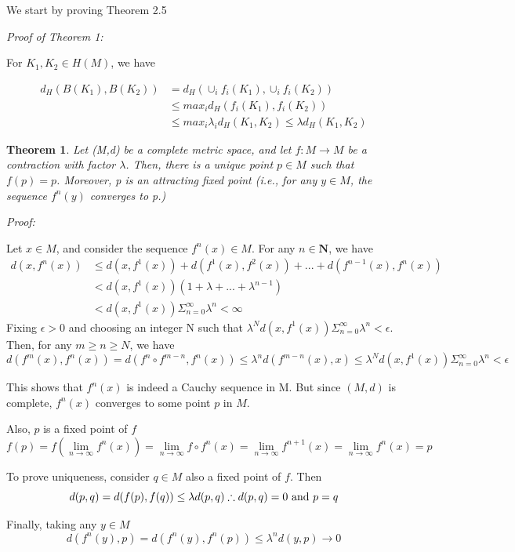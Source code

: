 \documentclass[a4paper]{article}
\theoremstyle{plain}
\newtheorem{theorem}{Theorem}[section] %
\theoremstyle{definition}
\begin{document}
We start by proving Theorem 2.5

\textit{Proof of Theorem 1: }

For $K_1, K_2 \in H(M)$, we have

\begin{align*}
    d_H(B(K_1), B(K_2)) &= d_H(\cup_i f_i(K_1),\cup_i f_i(K_2))\\
    &\leq max_i d_H(f_i(K_1),f_i(K_2))\\
    &\leq max_i \lambda _i d_H(K_1,K_2) \leq \lambda d_H(K_1,K_2)
\end{align*}
\qedsymbol

\begin{theorem}
Let (M,d) be a complete metric space, and let $f: M\rightarrow M$ be a contraction with factor $\lambda$. Then, there is a unique point $p \in M$ such that $f(p) = p$. Moreover, p is an attracting fixed point (i.e., for any $y \in M$, the sequence $f^n(y)$ converges to p.)
\end{theorem}

\textit{Proof: }

Let $x \in M$, and consider the sequence $f^n(x) \in M$. For any $n \in \mathbf{N}$, we have
\begin{align*}
    d(x, f^n(x)) &\leq d(x, f^1(x)) + d(f^1(x), f^2(x)) + ... + d(f^{n-1}(x),f^n(x))\\
    &<d(x,f^1(x))(1 + \lambda + ... + \lambda^{n-1}) \\
    &< d(x, f^1(x))\Sigma^\infty_{n=0}\lambda^n < \infty
\end{align*}
Fixing $\epsilon > 0$ and choosing an integer N such that $\lambda^N d(x, f^1(x))\Sigma^{\infty}_{n=0}\lambda^n < \epsilon$. Then, for any $m \geq n \geq N$, we have
$$d(f^m(x),f^n(x)) = d(f^n\circ f^{m-n},f^n(x)) \leq \lambda^n d(f^{m-n}(x),x) \leq \lambda^N d(x,f^1(x))\Sigma^\infty_{n=0}\lambda^n < \epsilon$$

This shows that $f^n(x)$ is indeed a Cauchy sequence in M. But since $(M,d)$ is complete, $f^n(x)$ converges to some point $p$ in $M$.

Also, $p$ is a fixed point of $f$
$$f(p) = f(\lim_{n\rightarrow\infty}f^n(x)) = \lim_{n\rightarrow\infty}f\circ f^n(x) = \lim_{n\rightarrow\infty}f^{n+1}(x) = \lim_{n\rightarrow\infty}f^n(x) = p$$

To prove uniqueness, consider $q \in M$ also a fixed point of $f$. Then
$$d(p,q) = d(f(p),f(q)) \leq \lambda d(p,q) \therefore d(p,q) = 0 \textnormal{ and } p=q$$

Finally, taking any $y \in M$
$$d(f^n(y),p) = d(f^n(y),f^n(p)) \leq \lambda^n d(y,p) \rightarrow 0$$
\end{document}
